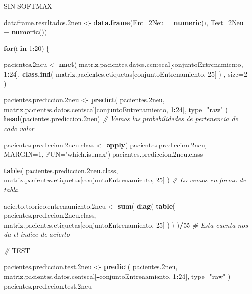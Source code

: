 \documentclass[]{article}
\newenvironment{Shaded}{\begin{snugshade}}{\end{snugshade}}
\newcommand{\KeywordTok}[1]{\textcolor[rgb]{0.13,0.29,0.53}{\textbf{#1}}}
\newcommand{\DataTypeTok}[1]{\textcolor[rgb]{0.13,0.29,0.53}{#1}}
\newcommand{\DecValTok}[1]{\textcolor[rgb]{0.00,0.00,0.81}{#1}}
\newcommand{\StringTok}[1]{\textcolor[rgb]{0.31,0.60,0.02}{#1}}
\newcommand{\CommentTok}[1]{\textcolor[rgb]{0.56,0.35,0.01}{\textit{#1}}}
\newcommand{\ControlFlowTok}[1]{\textcolor[rgb]{0.13,0.29,0.53}{\textbf{#1}}}
\newcommand{\OperatorTok}[1]{\textcolor[rgb]{0.81,0.36,0.00}{\textbf{#1}}}
\newcommand{\AlertTok}[1]{\textcolor[rgb]{0.94,0.16,0.16}{#1}}
\newcommand{\NormalTok}[1]{#1}
\begin{document}
SIN SOFTMAX

\begin{Shaded}
\begin{Highlighting}[]
\NormalTok{dataframe.resultados.2neu <-}\StringTok{ }\KeywordTok{data.frame}\NormalTok{(}\DataTypeTok{Ent_2Neu =} \KeywordTok{numeric}\NormalTok{(),}
                                        \DataTypeTok{Test_2Neu =} \KeywordTok{numeric}\NormalTok{())}

\ControlFlowTok{for}\NormalTok{(i }\ControlFlowTok{in} \DecValTok{1}\OperatorTok{:}\DecValTok{20}\NormalTok{)}
\NormalTok{\{}

\NormalTok{  pacientes.2neu <-}\StringTok{ }\KeywordTok{nnet}\NormalTok{( matriz.pacientes.datos.centscal[conjuntoEntrenamiento, }\DecValTok{1}\OperatorTok{:}\DecValTok{24}\NormalTok{], }\KeywordTok{class.ind}\NormalTok{( matriz.pacientes.etiquetas[conjuntoEntrenamiento, }\DecValTok{25}\NormalTok{] ) , }\DataTypeTok{size=}\DecValTok{2}\NormalTok{ )}
  
\NormalTok{  pacientes.prediccion.2neu <-}\StringTok{ }\KeywordTok{predict}\NormalTok{( pacientes.2neu, matriz.pacientes.datos.centscal[conjuntoEntrenamiento, }\DecValTok{1}\OperatorTok{:}\DecValTok{24}\NormalTok{], }\DataTypeTok{type=}\StringTok{"raw"}\NormalTok{ )}
  \KeywordTok{head}\NormalTok{(pacientes.prediccion.2neu) }\CommentTok{# Vemos las probabilidades de pertenencia de cada valor}
  
\NormalTok{  pacientes.prediccion.2neu.class <-}\StringTok{ }\KeywordTok{apply}\NormalTok{( pacientes.prediccion.2neu, }\DataTypeTok{MARGIN=}\DecValTok{1}\NormalTok{, }\DataTypeTok{FUN=}\StringTok{'which.is.max'}\NormalTok{)}
\NormalTok{  pacientes.prediccion.2neu.class}
  
  
  \KeywordTok{table}\NormalTok{( pacientes.prediccion.2neu.class, matriz.pacientes.etiquetas[conjuntoEntrenamiento, }\DecValTok{25}\NormalTok{] )  }\CommentTok{# Lo vemos en forma de tabla.}
  
\NormalTok{  acierto.teorico.entrenamiento.2neu <-}\StringTok{ }\KeywordTok{sum}\NormalTok{( }\KeywordTok{diag}\NormalTok{( }\KeywordTok{table}\NormalTok{( pacientes.prediccion.2neu.class, matriz.pacientes.etiquetas[conjuntoEntrenamiento, }\DecValTok{25}\NormalTok{] ) ) )}\OperatorTok{/}\DecValTok{55} \CommentTok{# Esta cuenta nos da el índice de acierto}
  
  \CommentTok{# }\AlertTok{TEST}
  
\NormalTok{  pacientes.prediccion.test.2neu <-}\StringTok{ }\KeywordTok{predict}\NormalTok{( pacientes.2neu, matriz.pacientes.datos.centscal[}\OperatorTok{-}\NormalTok{conjuntoEntrenamiento, }\DecValTok{1}\OperatorTok{:}\DecValTok{24}\NormalTok{], }\DataTypeTok{type=}\StringTok{"raw"}\NormalTok{ )}
\NormalTok{  pacientes.prediccion.test.2neu}
  

\end{Highlighting}
\end{Shaded}
\end{document}
